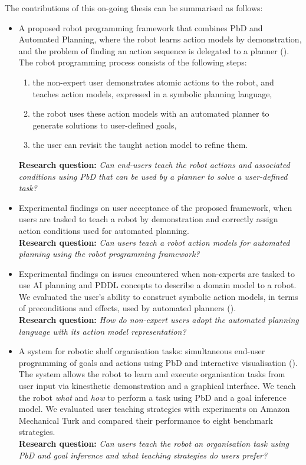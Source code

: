 The contributions of this on-going thesis can be summarised as follows:
\begin{itemize}
	\item {A proposed robot programming framework that combines PbD and Automated Planning, where the robot learns action models by demonstration, and the problem of finding an action sequence is delegated to a planner (\cite{liang2017framework}).
	The robot programming process consists of the following steps:
	\begin{enumerate}
		\item the non-expert user demonstrates atomic actions to the robot, and teaches {action models}, expressed in a symbolic planning language,
		\item the robot uses these action models with an automated planner to generate solutions to user-defined goals,
		\item the user can revisit the taught action model to refine them.
	\end{enumerate}
	\textbf{Research question:} \textit{Can end-users teach the robot actions and associated conditions using PbD that can be used by a planner to solve a user-defined task?}}
    \item {Experimental findings on user acceptance of the proposed framework, when users are tasked to teach a robot by demonstration and correctly assign action conditions used for automated planning.\\
    \textbf{Research question:} \textit{Can users teach a robot action models for automated planning using the robot programming framework?}}
    \item {Experimental findings on issues encountered when non-experts are tasked to use AI planning and PDDL concepts to describe a domain model to a robot. 
    We evaluated the user's ability to construct symbolic action models, in terms of preconditions and effects, used by automated planners (\cite{liang2017evaluation}).\\
    \textbf{Research question:} \textit{How do non-expert users adopt the automated planning language with its action model representation?}}
    \item {A system for robotic shelf organisation tasks: simultaneous end-user programming of goals and actions using PbD and interactive visualisation (\cite{liang2018simultaneous}).
    The system allows the robot to learn and execute organisation tasks from user input via kinesthetic demonstration and a graphical interface.
    We teach the robot \textit{what} and \textit{how} to perform a task using PbD and a goal inference model.
    We evaluated user teaching strategies with experiments on Amazon Mechanical Turk and compared their performance to eight benchmark strategies.\\
    \textbf{Research question:} \textit{Can users teach the robot an organisation task using PbD and goal inference and what teaching strategies do users prefer?}}
\end{itemize}
